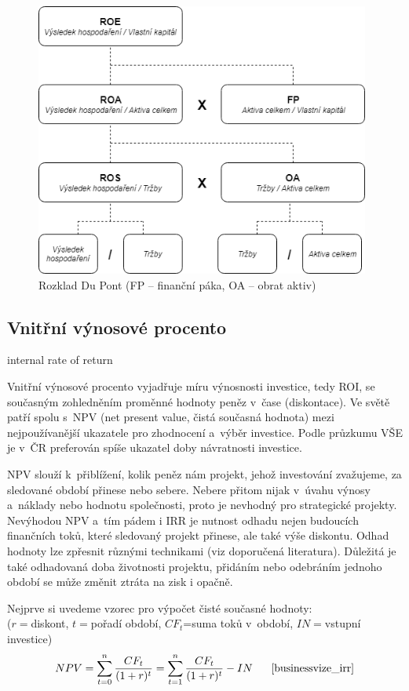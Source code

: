 \begin{figure}
  \centering
  \includegraphics[width=11cm]{img/dupont.png}
  \caption{Rozklad Du Pont \cite{ruck} (FP -- finanční páka, OA -- obrat aktiv)}
  \label{dupont}
\end{figure}

\subsection{Vnitřní výnosové procento}
\label{vvp}
internal rate of return

Vnitřní výnosové procento vyjadřuje míru výnosnosti investice, tedy ROI, se současným zohledněním proměnné hodnoty peněz v~čase (diskontace). Ve světě patří spolu s~NPV (net present value, čistá současná hodnota) mezi nejpoužívanější ukazatele pro zhodnocení a~výběr investice. Podle průzkumu VŠE je v~ČR preferován spíše ukazatel doby návratnosti investice.\cite{businessvize_irr}

NPV slouží k~přiblížení, kolik peněz nám projekt, jehož investování zvažujeme, za sledované období přinese nebo sebere. Nebere přitom nijak v~úvahu výnosy a~náklady nebo hodnotu společnosti, proto je nevhodný pro strategické projekty. Nevýhodou NPV a~tím pádem i IRR je nutnost odhadu nejen budoucích finančních toků, které sledovaný projekt přinese, ale také výše diskontu. Odhad hodnoty lze zpřesnit různými technikami (viz doporučená literatura). Důležitá je také odhadovaná doba životnosti projektu, přidáním nebo odebráním jednoho období se může změnit ztráta na zisk i opačně.

Nejprve si uvedeme vzorec pro výpočet čisté současné hodnoty: 
\\($r=$diskont, $t=$pořadí období, $CF_t$=suma toků v~období, $IN=$vstupní investice)
$$NPV=\sum\limits_{t=0}^{n} \dfrac{CF_t}{(1+r)^t} = \sum\limits_{t=1}^{n} \dfrac{CF_t}{(1+r)^t} - IN\scite{businessvize_irr}$$

